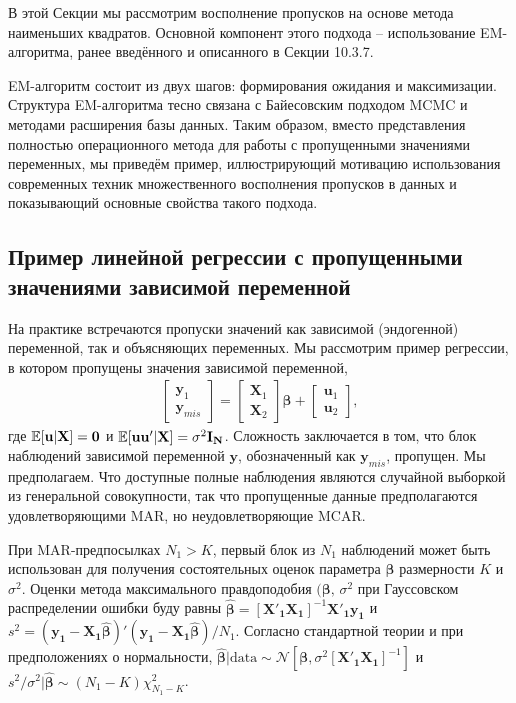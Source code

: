 В этой Секции мы рассмотрим восполнение пропусков на основе метода наименьших квадратов. Основной компонент этого подхода – использование EM-алгоритма, ранее введённого и описанного в Секции 10.3.7. 

EM-алгоритм состоит из двух шагов: формирования ожидания и максимизации. Структура EM-алгоритма тесно связана с Байесовским подходом MCMC и методами расширения базы данных. Таким образом, вместо представления полностью операционного метода для работы с пропущенными значениями переменных, мы приведём пример, иллюстрирующий мотивацию использования современных техник множественного восполнения пропусков в данных и показывающий основные свойства такого подхода.

\subsection{Пример линейной регрессии с пропущенными значениями зависимой переменной} 

На практике встречаются пропуски значений как зависимой (эндогенной) переменной, так и объясняющих переменных. Мы рассмотрим пример регрессии, в котором пропущены значения зависимой переменной,
\begin{align}
\begin{bmatrix}
\mathbf{y}_1 \\ \mathbf{y}_{mis} 
\end{bmatrix} 
= 
\begin{bmatrix}
\mathbf{X}_1 \\ \mathbf{X}_2 
\end{bmatrix} 
\mathbf{\beta}
+
\begin{bmatrix}
\mathbf{u}_1 \\ \mathbf{u}_2 
\end{bmatrix}
,
\end{align}
где $\mathbb{E}[\mathbf{u|X}]= \mathbf{0}$ и $\mathbb{E}[\mathbf{uu'|X}]= \sigma^2\mathbf{I_N}$. Сложность заключается в том, что блок наблюдений зависимой переменной $\mathbf{y}$, обозначенный как $\mathbf{y}_{mis}$, пропущен. Мы предполагаем. Что доступные полные наблюдения являются случайной выборкой из генеральной совокупности, так что пропущенные данные предполагаются удовлетворяющими MAR, но неудовлетворяющие MCAR.

При MAR-предпосылках $N_1>K$, первый блок из $N_1$ наблюдений может быть использован для получения состоятельных оценок  параметра $\mathbf{\beta}$ размерности $K$ и $\sigma^2$. Оценки метода максимального правдоподобия $(\mathbf{\beta}, \, \sigma^2$  при Гауссовском распределении ошибки буду равны $\widehat{\mathbf{\beta}}=[\mathbf{X'_1 X_1}]^{-1}\mathbf{X'_1 y_1}$ и $s^2=(\mathbf{y_1-X_1}\widehat{\mathbf{\beta}})'(\mathbf{y_1-X_1}\widehat{\mathbf{\beta}})/N_1$. Согласно стандартной теории и при предположениях о нормальности, $\widehat{\mathbf{\beta}}|\text{data} \sim \mathcal{N}[\mathbf{\beta}, \sigma^2[\mathbf{X'_1 X_1}]^{-1}]$ и $s^2 / \sigma^2 | \widehat{\mathbf{\beta}} \sim (N_1-K)\chi^2_{N_1-K}$.

